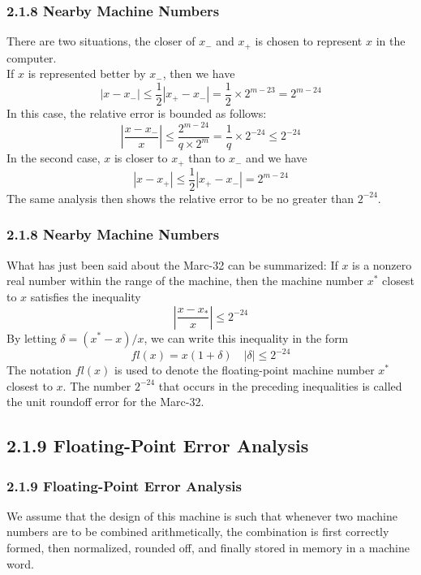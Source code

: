 \documentclass[notheorems,mathserif,table,compress]{beamer}  %
\begin{document}
\begin{frame}
  \frametitle{2.1.8 Nearby Machine Numbers}
  There are two situations, the closer of $x_-$ and $x_+$ is chosen to represent $x$ in the computer.\\
  If $x$ is represented better by $x_-$, then we have
  \begin{displaymath}
  |x-x_-|\le \frac{1}{2}|x_+-x_-|=\frac{1}{2}\times2^{m-23}=2^{m-24}
  \end{displaymath}
  In this case, the relative error is bounded as follows:
  \begin{displaymath}
  \left| \frac{x-x_-}{x} \right| \le \frac{2^{m-24}}{q \times 2^m} =\frac{1}{q} \times 2^{-24} \le 2^{-24}
  \end{displaymath}
  In the second case, $x$ is closer to $x_+$ than to $x_-$ and we have
  \begin{displaymath}
  |x-x_+| \le \frac{1}{2}|x_+-x_-|=2^{m-24}
  \end{displaymath}
  The same analysis then shows the relative error to be no greater than $2^{-24}$.
\end{frame}


\begin{frame}
  \frametitle{2.1.8 Nearby Machine Numbers}
  What has just been said about the Marc-32 can be summarized: If $x$ is a nonzero real number within the range of the machine, then the machine number $x^*$ closest to $x$ satisfies the inequality
  \begin{displaymath}
  \left| \frac{x-x_*}{x} \right| \le 2^{-24} 
  \end{displaymath}
  By letting $\delta =(x^*-x)/x$, we can write this inequality in the form
  \begin{displaymath}
  fl(x)=x(1+\delta) \quad |\delta| \le 2^{-24}
  \end{displaymath}
  The notation $fl(x)$ is used to denote the floating-point machine number $x^*$ closest to $x$.
  The number $2^{-24}$ that occurs in the preceding inequalities is called the unit roundoff error for the Marc-32.
\end{frame}



\subsection{2.1.9 Floating-Point Error Analysis}

\begin{frame}
  \frametitle{2.1.9 Floating-Point Error Analysis}
  We assume that the design of this machine is such that whenever two machine numbers are to be combined arithmetically, the combination is first correctly formed, then normalized, rounded off, and finally stored in memory in a machine word.  
\end{frame}
\end{document}
